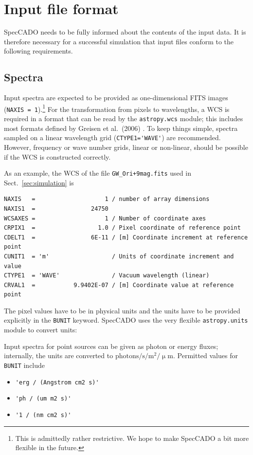 \documentclass[a4paper,twoside,11pt]{article}
\newcommand{\micron}{\upmu\mathrm{m}}
\begin{document}
\section{Input file format}
\label{sec:input_format}

SpecCADO needs to be fully informed about the contents of the input
data. It is therefore necessary for a successful simulation that input
files conform to the following requirements.

\subsection{Spectra}
\label{ssec:input_spectra}

Input spectra are expected to be provided as one-dimensional FITS
images (\lstinline{NAXIS = 1}).\footnote{This is admittedly rather
  restrictive. We hope to make SpecCADO a bit more flexible in the
  future.}  For the transformation from pixels to wavelengths, a WCS
is required in a format that can be read by the
\lstinline{astropy.wcs} module; this includes most formats defined by
Greisen et al.\ (2006) \cite{Greisen2006}. To keep things simple,
spectra sampled on a linear wavelength grid
(\lstinline{CTYPE1='WAVE'}) are recommended. However, frequency or
wave number grids, linear or non-linear, should be possible if the WCS
is constructed correctly.

As an example, the WCS of the file \lstinline{GW_Ori+9mag.fits} used
in Sect.~\ref{sec:simulation} is
\begin{lstlisting}
NAXIS   =                    1 / number of array dimensions
NAXIS1  =                24750
WCSAXES =                    1 / Number of coordinate axes
CRPIX1  =                  1.0 / Pixel coordinate of reference point
CDELT1  =                6E-11 / [m] Coordinate increment at reference point
CUNIT1  = 'm'                  / Units of coordinate increment and value
CTYPE1  = 'WAVE'               / Vacuum wavelength (linear)
CRVAL1  =           9.9402E-07 / [m] Coordinate value at reference point
\end{lstlisting}

The pixel values have to be in physical units and the units have to be
provided explicitly in the \lstinline{BUNIT} keyword. SpecCADO uses
the very flexible \lstinline{astropy.units} module to convert units:

Input spectra for point sources can be given as photon or energy
fluxes; internally, the units are converted to
$\mathrm{photons}/\mathrm{s}/\mathrm{m^{2}}/\micron$.  Permitted
values for \lstinline{BUNIT} include
\begin{itemize}
\item \lstinline{'erg / (Angstrom cm2 s)'}
\item \lstinline{'ph / (um m2 s)'}
\item \lstinline{'1 / (nm cm2 s)'}
\end{itemize}
\end{document}
